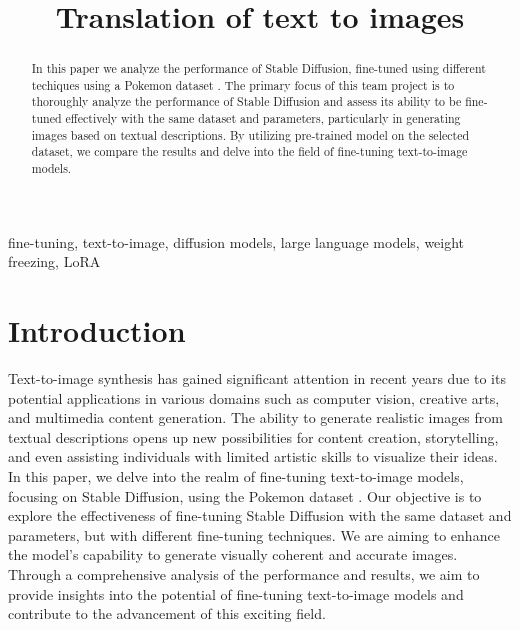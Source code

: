 \documentclass[conference]{IEEEtran}
\begin{document}
 \title{Translation of text to images} \author{  \and {} 
}
\maketitle

\begin{abstract}
In this paper we analyze the performance of Stable Diffusion, fine-tuned using different techiques using a Pokemon dataset \cite{pinkney2022pokemon}. The primary focus of this team project is to thoroughly analyze the performance of Stable Diffusion and assess its ability to be fine-tuned effectively with the same dataset and parameters, particularly in generating images based on textual descriptions. By utilizing pre-trained model on the selected dataset, we compare the results and delve into the field of fine-tuning text-to-image models.
\end{abstract}

\begin{IEEEkeywords}
fine-tuning, text-to-image, diffusion models, large language models, weight freezing, LoRA
\end{IEEEkeywords}

\section{Introduction}
Text-to-image synthesis has gained significant attention in recent years due to its potential applications in various domains such as computer vision, creative arts, and multimedia content generation. The ability to generate realistic images from textual descriptions opens up new possibilities for content creation, storytelling, and even assisting individuals with limited artistic skills to visualize their ideas. In this paper, we delve into the realm of fine-tuning text-to-image models, focusing on Stable Diffusion, using the Pokemon dataset \cite{pinkney2022pokemon}. Our objective is to explore the effectiveness of fine-tuning Stable Diffusion with the same dataset and parameters, but with different fine-tuning techniques. We are aiming to enhance the model's capability to generate visually coherent and accurate images. Through a comprehensive analysis of the performance and results, we aim to provide insights into the potential of fine-tuning text-to-image models and contribute to the advancement of this exciting field.
\end{document}
